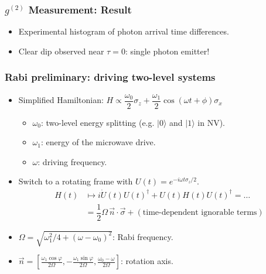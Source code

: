\documentclass{beamer}
\begin{document}
\begin{frame}
\frametitle{$g^{(2)}$ Measurement: Result}
\begin{itemize}
    \item Experimental histogram of photon arrival time differences.
    \item Clear dip observed near $\tau = 0$: single photon emitter!
\end{itemize}
\end{frame}

\begin{frame}
    \frametitle{Rabi preliminary: driving two-level systems}
    \begin{itemize}
        \item Simplified Hamiltonian: $H \propto \dfrac{\omega_0}{2} \sigma_z + \dfrac{\omega_1}{2} \cos(\omega t + \phi) \sigma_x$
        \begin{itemize}
            \item $\omega_0$: two-level energy splitting (e.g. $|0\rangle$ and $|1\rangle$ in NV). 
            \item $\omega_1$: energy of the microwave drive. 
            \item $\omega$: driving frequency. 
        \end{itemize}

        \item Switch to a rotating frame with $U(t) = e^{-i\omega t \sigma_z/2}$. 
        \begin{align*}
            H(t) 
            &\mapsto i \dot U(t)U(t)^\dag + U(t) H(t) U(t)^\dag = \dots \\ 
            &= \dfrac 1 2 \Omega \, \vec n\cdot \vec \sigma + (\text{time-dependent ignorable terms})
        \end{align*}
        \item $\Omega = \sqrt{\omega_1^2/4 + (\omega - \omega_0)^2}$: Rabi frequency. 
        \item $\vec{n} = \left[\frac{\omega_1 \cos \varphi}{2\Omega}, -\frac{\omega_1 \sin \varphi}{2\Omega}, \frac{\omega_0-\omega}{2\Omega}\right]$: rotation axis. 
    \end{itemize}
\end{frame}
\end{document}
